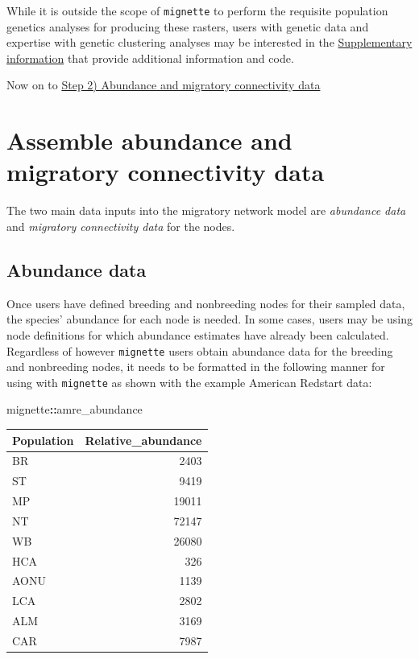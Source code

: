 \documentclass[
]{book}
\newenvironment{Shaded}{\begin{snugshade}}{\end{snugshade}}
\newcommand{\NormalTok}[1]{#1}
\newcommand{\SpecialCharTok}[1]{\textcolor[rgb]{0.81,0.36,0.00}{\textbf{#1}}}
\begin{document}
While it is outside the scope of \texttt{mignette} to perform the requisite population genetics analyses for producing these rasters, users with genetic data and expertise with genetic clustering analyses may be interested in the \protect\hyperlink{supplemental}{Supplementary information} that provide additional information and code.

Now on to \protect\hyperlink{data}{Step 2) Abundance and migratory connectivity data}

\hypertarget{data}{%
\chapter{Assemble abundance and migratory connectivity data}\label{data}}

The two main data inputs into the migratory network model are \emph{abundance data} and \emph{migratory connectivity data} for the nodes.

\hypertarget{abundance-data}{%
\section{Abundance data}\label{abundance-data}}

Once users have defined breeding and nonbreeding nodes for their sampled data, the species' abundance for each node is needed. In some cases, users may be using node definitions for which abundance estimates have already been calculated. Regardless of however \texttt{mignette} users obtain abundance data for the breeding and nonbreeding nodes, it needs to be formatted in the following manner for using with \texttt{mignette} as shown with the example American Redstart data:

\begin{Shaded}
\begin{Highlighting}[]
\NormalTok{mignette}\SpecialCharTok{::}\NormalTok{amre\_abundance}
\end{Highlighting}
\end{Shaded}

\begin{tabular}{l|r}
\hline
Population & Relative\_abundance\\
\hline
BR & 2403\\
\hline
ST & 9419\\
\hline
MP & 19011\\
\hline
NT & 72147\\
\hline
WB & 26080\\
\hline
HCA & 326\\
\hline
AONU & 1139\\
\hline
LCA & 2802\\
\hline
ALM & 3169\\
\hline
CAR & 7987\\
\hline
\end{tabular}
\end{document}

